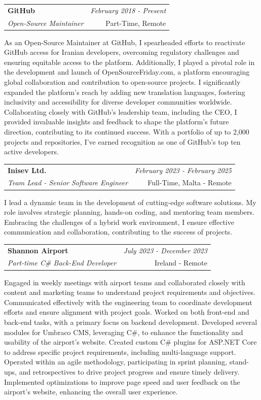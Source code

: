 \documentclass[a4paper,10pt]{article}
\makeatletter
\newcommand{\resumeSubheading}[4]{
	\vspace{0.5mm}\item
	\begin{tabular*}{0.98\textwidth}[t]{l@{\extracolsep{\fill}}r}
		\textbf{#1} & \textit{\footnotesize{#4}} \\
		\textit{\footnotesize{#3}} &  \footnotesize{#2}\\
	\end{tabular*}
	\vspace{-2.4mm}
}
\newcommand{\resumeItemListStart}{\begin{justify}\begin{itemize}[leftmargin=3ex, rightmargin=2ex, noitemsep,labelsep=1.2mm,itemsep=0mm]\small}
\newcommand{\resumeItemListEnd}{\end{itemize}\end{justify}\vspace{-2mm}}
\makeatother
\begin{document}
\vspace{-1mm}
\resumeSubheading
{GitHub}{Part-Time, Remote}
{Open-Source Maintainer}{February 2018 - Present}
\resumeItemListStart
As an Open-Source Maintainer at GitHub, I spearheaded efforts to reactivate GitHub access for Iranian developers, overcoming regulatory challenges and ensuring equitable access to the platform. Additionally, I played a pivotal role in the development and launch of OpenSourceFriday.com, a platform encouraging global collaboration and contribution to open-source projects. I significantly expanded the platform's reach by adding new translation languages, fostering inclusivity and accessibility for diverse developer communities worldwide. Collaborating closely with GitHub's leadership team, including the CEO, I provided invaluable insights and feedback to shape the platform's future direction, contributing to its continued success. With a portfolio of up to 2,000 projects and repositories, I've earned recognition as one of GitHub's top ten active developers.
\resumeItemListEnd

\vspace{-1mm}
\resumeSubheading
{Inisev Ltd.}{Full-Time, Malta - Remote}
{Team Lead - Senior Software Engineer}{February 2023 - February 2025}
\resumeItemListStart
I lead a dynamic team in the development of cutting-edge software solutions. My role involves strategic planning, hands-on coding, and mentoring team members. Embracing the challenges of a hybrid work environment, I ensure effective communication and collaboration, contributing to the success of projects.
\resumeItemListEnd

\vspace{-1mm}
\resumeSubheading
{Shannon Airport}{Ireland - Remote}
{Part-time C\# Back-End Developer}{July 2023 - December 2023}
\resumeItemListStart
Engaged in weekly meetings with airport teams and collaborated closely with content and marketing teams to understand project requirements and objectives. Communicated effectively with the engineering team to coordinate development efforts and ensure alignment with project goals. Worked on both front-end and back-end tasks, with a primary focus on backend development. Developed several modules for Umbraco CMS, leveraging C\#, to enhance the functionality and usability of the airport's website. Created custom C\# plugins for ASP.NET Core to address specific project requirements, including multi-language support. Operated within an agile methodology, participating in sprint planning, stand-ups, and retrospectives to drive project progress and ensure timely delivery. Implemented optimizations to improve page speed and user feedback on the airport's website, enhancing the overall user experience.
\resumeItemListEnd
\end{document}
